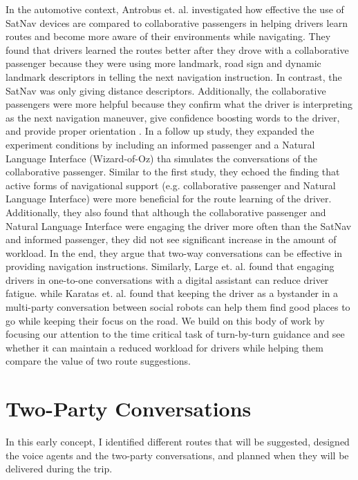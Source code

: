 In the automotive context, Antrobus et. al. investigated how effective the use of SatNav devices are compared to collaborative passengers in helping drivers learn routes and become more aware of their environments while navigating. They found that drivers learned the routes better after they drove with a collaborative passenger because they were using more landmark, road sign and dynamic landmark descriptors in telling the next navigation instruction. In contrast, the SatNav was only giving distance descriptors. Additionally, the collaborative passengers were more helpful because they  confirm what the driver is interpreting as the next navigation maneuver, give confidence boosting words to the driver, and provide proper orientation \cite{Antrobus2017Driver-PassengerSystems}. In a follow up study\cite{antrobus_large_burnett_hare_2019}, they expanded the experiment conditions by including an informed passenger and a Natural Language Interface (Wizard-of-Oz) tha simulates the conversations of the collaborative passenger. Similar to the first study, they echoed the finding that active forms of navigational support (e.g. collaborative passenger and Natural Language Interface) were more beneficial for the route learning of the driver. Additionally, they also found that although the collaborative passenger and Natural Language Interface were engaging the driver more often than the SatNav and informed passenger, they did not see significant increase in the amount of workload. In the end, they argue that two-way conversations can be effective in providing navigation instructions. Similarly, Large et. al. \cite{Large2018} found that engaging drivers in one-to-one conversations with a digital assistant can reduce driver fatigue. while Karatas et. al. \cite{Karatas2018} found that keeping the driver as a bystander in a multi-party conversation between social robots can help them find good places to go while keeping their focus on the road. We build on this body of work by focusing our attention to the time critical task of turn-by-turn guidance and see whether it can maintain a reduced workload for drivers while helping them compare the value of two route suggestions.

\section{Two-Party Conversations}
In this early concept, I identified different routes that will be suggested, designed the voice agents and the two-party conversations, and planned when they will be delivered during the trip.

